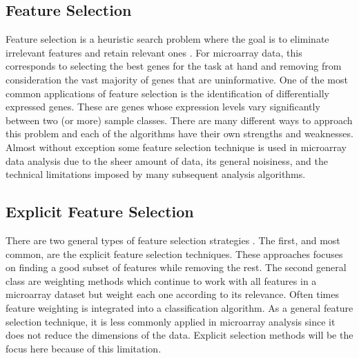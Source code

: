 \subsection{Feature Selection}

Feature selection is a heuristic search problem where the goal is to eliminate
irrelevant features and retain relevant ones \cite{PMID_15219288}.  For microarray data,
this corresponds to selecting the best genes for the task at hand and removing
from consideration the vast majority of genes that are uninformative. One of
the most common applications of feature selection is the identification of
differentially expressed genes.  These are genes whose expression levels vary
significantly between two (or more) sample classes.  There are many different
ways to approach this problem and each of the algorithms have their own
strengths and weaknesses.  Almost without exception some feature
selection technique is used in microarray data analysis due to the sheer amount
of data, its general noisiness, and the technical limitations imposed by many
subsequent analysis algorithms.

\subsection{Explicit Feature Selection}

There are two general types of feature selection strategies
\cite{Xing_2003,PMID_15219288}.  The first, and most common, are the explicit feature
selection techniques.  These approaches focuses on finding a good subset of
features while removing the rest. The second general class are weighting
methods which continue to work with all features in a microarray dataset but
weight each one according to its relevance.  Often times feature weighting
is integrated into a classification algorithm.  As a general
feature selection technique, it is less commonly applied in microarray analysis
since it does not reduce the dimensions of the data.  Explicit selection
methods will be the focus here because of this limitation.


